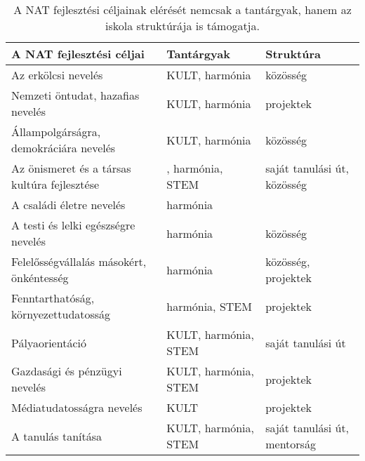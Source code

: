 \begin{table}

  \begin{tabular}{p{5cm}|>{\raggedright}p{3cm}|p{3cm}}

    \textbf{A NAT fejlesztési céljai}               & \textbf{Tantárgyak}  & \textbf{Struktúra}           \\
    \hline
    Az erkölcsi nevelés                          & KULT, harmónia       & közösség                     \\ \hline
    Nemzeti öntudat, hazafias nevelés            & KULT, harmónia       & projektek                    \\ \hline
    Állampolgárságra, demokráciára nevelés       & KULT, harmónia       & közösség                     \\ \hline
    Az önismeret és a társas kultúra fejlesztése & , harmónia, STEM & saját
    tanulási út, közösség                                                                              \\ \hline
    A családi életre nevelés                     & harmónia             &                              \\ \hline
    A testi és lelki egészségre nevelés          & harmónia             & közösség                     \\ \hline
    Felelősségvállalás másokért, önkéntesség     & harmónia             & közösség, pro\-jek\-tek      \\
    \hline
    Fenntarthatóság, környezettudatosság         & harmónia, STEM       & projektek                    \\ \hline
    Pályaorientáció                              & KULT, harmónia, STEM & saját tanulási út            \\ \hline
    Gazdasági és pénzügyi nevelés                & KULT, harmónia, STEM & projektek                    \\ \hline
    Médiatudatosságra nevelés                    & KULT                 & projektek                    \\ \hline
    A tanulás tanítása                           & KULT, harmónia, STEM & saját tanulási út, mentorság \\

  \end{tabular}
  \caption{A NAT fejlesztési céljainak elérését nemcsak a tantárgyak, hanem az
    iskola struktúrája is támogatja.}
  \label{tbl:nat_fejlesztesi}
\end{table}

